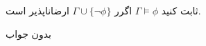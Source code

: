 ثابت کنید $\Gamma\models\phi$ اگرر $\Gamma\cup\{\neg\phi\}$ ارضاناپذیر است.
\begin{ans}
بدون جواب
\end{ans}
